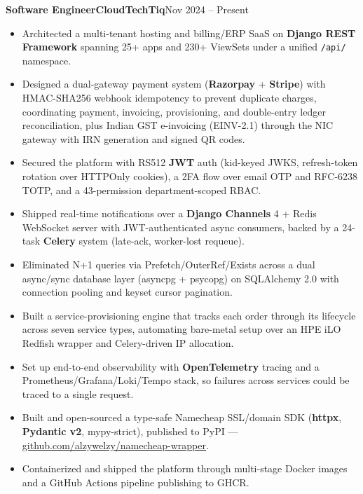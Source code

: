 \documentclass[11pt,a4paper]{article}
\newcommand{\entry}[3]{%
  \vspace{4.5pt}\noindent\textbf{#1}\hfill\textbf{#2}\hfill{\color{subtlegray}#3}\par\vspace{2pt}}
\begin{document}
\entry{Software Engineer}{CloudTechTiq}{Nov 2024 -- Present}
\begin{itemize}
  \item Architected a multi-tenant hosting and billing/ERP SaaS on \textbf{Django
        REST Framework} spanning 25+ apps and 230+ ViewSets under a unified
        \texttt{/api/} namespace.
  \item Designed a dual-gateway payment system (\textbf{Razorpay} +
        \textbf{Stripe}) with HMAC-SHA256 webhook idempotency to prevent duplicate
        charges, coordinating payment, invoicing, provisioning, and double-entry
        ledger reconciliation, plus Indian GST e-invoicing (EINV-2.1) through the
        NIC gateway with IRN generation and signed QR codes.
  \item Secured the platform with RS512 \textbf{JWT} auth (kid-keyed JWKS,
        refresh-token rotation over HTTPOnly cookies), a 2FA flow over email OTP
        and RFC-6238 TOTP, and a 43-permission department-scoped RBAC.
  \item Shipped real-time notifications over a \textbf{Django Channels} 4 + Redis
        WebSocket server with JWT-authenticated async consumers, backed by a
        24-task \textbf{Celery} system (late-ack, worker-lost requeue).
  \item Eliminated N+1 queries via Prefetch/OuterRef/Exists across a dual
        async/sync database layer (asyncpg + psycopg) on SQLAlchemy 2.0 with
        connection pooling and keyset cursor pagination.
  \item Built a service-provisioning engine that tracks each order through its
        lifecycle across seven service types, automating bare-metal setup over an
        HPE iLO Redfish wrapper and Celery-driven IP allocation.
  \item Set up end-to-end observability with \textbf{OpenTelemetry} tracing and a
        Prometheus/Grafana/Loki/Tempo stack, so failures across services could be
        traced to a single request.
  \item Built and open-sourced a type-safe Namecheap SSL/domain SDK
        (\textbf{httpx}, \textbf{Pydantic v2}, mypy-strict), published to PyPI ---
        \href{https://github.com/alzywelzy/namecheap-wrapper}{github.com/alzywelzy/namecheap-wrapper}.
  \item Containerized and shipped the platform through multi-stage Docker images
        and a GitHub Actions pipeline publishing to GHCR.
\end{itemize}
\end{document}
